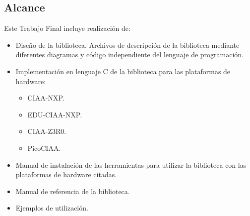 \subsection{Alcance}
\label{subsec:alcance}

Este Trabajo Final incluye realización de:

\begin{itemize}
   \item Diseño de la biblioteca. Archivos de descripción de la biblioteca mediante diferentes diagramas y código independiente del lenguaje de programación.
   \item Implementación en lenguaje C de la biblioteca para las plataformas de hardware:
   \begin{itemize}
      \item CIAA-NXP.
      \item EDU-CIAA-NXP.
      \item CIAA-Z3R0.
      \item PicoCIAA.
   \end{itemize}
   \item Manual de instalación de las herramientas para utilizar la biblioteca con las plataformas de hardware citadas.
   \item Manual de referencia de la biblioteca.
   \item Ejemplos de utilización.
\end{itemize}
